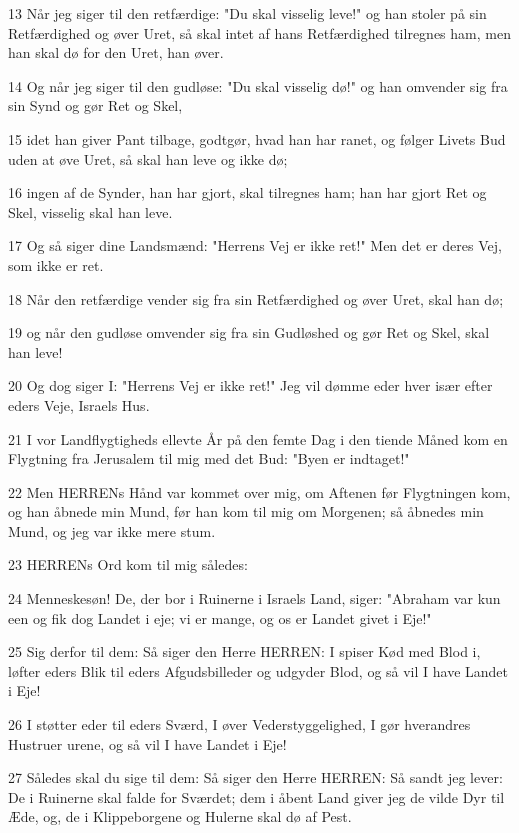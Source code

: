 \par 13 Når jeg siger til den retfærdige: "Du skal visselig leve!" og han stoler på sin Retfærdighed og øver Uret, så skal intet af hans Retfærdighed tilregnes ham, men han skal dø for den Uret, han øver.
\par 14 Og når jeg siger til den gudløse: "Du skal visselig dø!" og han omvender sig fra sin Synd og gør Ret og Skel,
\par 15 idet han giver Pant tilbage, godtgør, hvad han har ranet, og følger Livets Bud uden at øve Uret, så skal han leve og ikke dø;
\par 16 ingen af de Synder, han har gjort, skal tilregnes ham; han har gjort Ret og Skel, visselig skal han leve.
\par 17 Og så siger dine Landsmænd: "Herrens Vej er ikke ret!" Men det er deres Vej, som ikke er ret.
\par 18 Når den retfærdige vender sig fra sin Retfærdighed og øver Uret, skal han dø;
\par 19 og når den gudløse omvender sig fra sin Gudløshed og gør Ret og Skel, skal han leve!
\par 20 Og dog siger I: "Herrens Vej er ikke ret!" Jeg vil dømme eder hver især efter eders Veje, Israels Hus.
\par 21 I vor Landflygtigheds ellevte År på den femte Dag i den tiende Måned kom en Flygtning fra Jerusalem til mig med det Bud: "Byen er indtaget!"
\par 22 Men HERRENs Hånd var kommet over mig, om Aftenen før Flygtningen kom, og han åbnede min Mund, før han kom til mig om Morgenen; så åbnedes min Mund, og jeg var ikke mere stum.
\par 23 HERRENs Ord kom til mig således:
\par 24 Menneskesøn! De, der bor i Ruinerne i Israels Land, siger: "Abraham var kun een og fik dog Landet i eje; vi er mange, og os er Landet givet i Eje!"
\par 25 Sig derfor til dem: Så siger den Herre HERREN: I spiser Kød med Blod i, løfter eders Blik til eders Afgudsbilleder og udgyder Blod, og så vil I have Landet i Eje!
\par 26 I støtter eder til eders Sværd, I øver Vederstyggelighed, I gør hverandres Hustruer urene, og så vil I have Landet i Eje!
\par 27 Således skal du sige til dem: Så siger den Herre HERREN: Så sandt jeg lever: De i Ruinerne skal falde for Sværdet; dem i åbent Land giver jeg de vilde Dyr til Æde, og, de i Klippeborgene og Hulerne skal dø af Pest.
